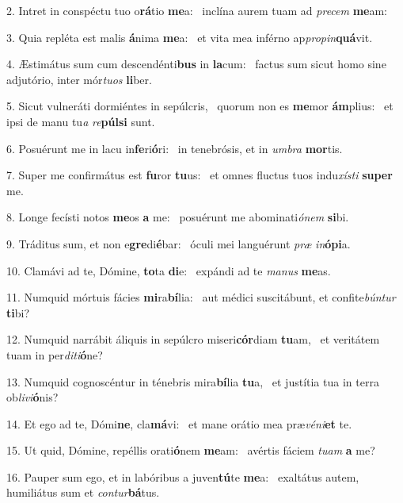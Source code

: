 2. Intret in conspéctu tuo o\textbf{rá}tio \textbf{me}a: \ast\  inclína aurem tuam ad \textit{pre}\textit{cem} \textbf{me}am:\

3. Quia repléta est malis \textbf{á}nima \textbf{me}a: \ast\  et vita mea inférno ap\textit{pro}\textit{pin}\textbf{quá}vit.\

4. Æstimátus sum cum descendénti\textbf{bus} in \textbf{la}cum: \ast\  factus sum sicut homo sine adjutório, inter mór\textit{tu}\textit{os} \textbf{li}ber.\

5. Sicut vulneráti dormiéntes in sepúlcris, \dag\  quorum non es \textbf{me}mor \textbf{ám}plius: \ast\  et ipsi de manu tu\textit{a} \textit{re}\textbf{púl}\textbf{si} sunt.\

6. Posuérunt me in lacu in\textbf{fe}ri\textbf{ó}ri: \ast\  in tenebrósis, et in \textit{um}\textit{bra} \textbf{mor}tis.\

7. Super me confirmátus est \textbf{fu}ror \textbf{tu}us: \ast\  et omnes fluctus tuos indu\textit{xís}\textit{ti} \textbf{su}\textbf{per} me.\

8. Longe fecísti notos \textbf{me}os \textbf{a} me: \ast\  posuérunt me abominati\textit{ó}\textit{nem} \textbf{si}bi.\

9. Tráditus sum, et non e\textbf{gre}di\textbf{é}bar: \ast\  óculi mei languérunt \textit{præ} \textit{in}\textbf{ó}\textbf{pi}a.\

10. Clamávi ad te, Dómine, \textbf{to}ta \textbf{di}e: \ast\  expándi ad te \textit{ma}\textit{nus} \textbf{me}as.\

11. Numquid mórtuis fácies \textbf{mi}ra\textbf{bí}lia: \ast\  aut médici suscitábunt, et confite\textit{bún}\textit{tur} \textbf{ti}bi?\

12. Numquid narrábit áliquis in sepúlcro miseri\textbf{cór}diam \textbf{tu}am, \ast\  et veritátem tuam in per\textit{di}\textit{ti}\textbf{ó}ne?\

13. Numquid cognoscéntur in ténebris mira\textbf{bí}lia \textbf{tu}a, \ast\  et justítia tua in terra ob\textit{li}\textit{vi}\textbf{ó}nis?\

14. Et ego ad te, Dómi\textbf{ne}, cla\textbf{má}vi: \ast\  et mane orátio mea præ\textit{vé}\textit{ni}\textbf{et} te.\

15. Ut quid, Dómine, repéllis orati\textbf{ó}nem \textbf{me}am: \ast\  avértis fáciem \textit{tu}\textit{am} \textbf{a} me?\

16. Pauper sum ego, et in labóribus a juven\textbf{tú}te \textbf{me}a: \ast\  exaltátus autem, humiliátus sum et \textit{con}\textit{tur}\textbf{bá}tus.\


